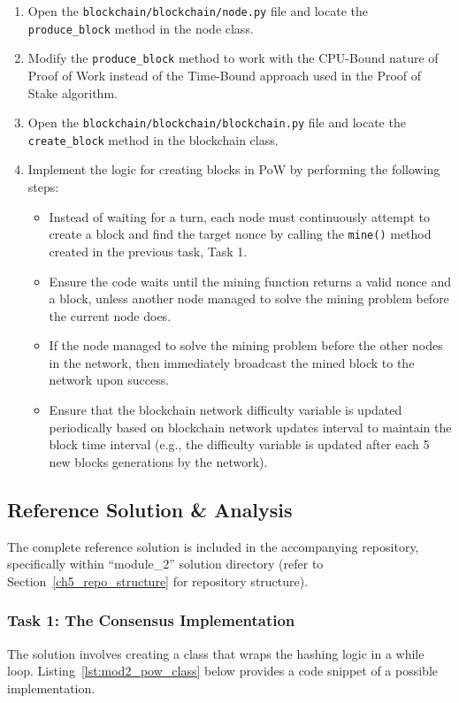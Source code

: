 \begin{enumerate}
    \item Open the \texttt{blockchain/blockchain/node.py} file and locate the \texttt{produce\_block} method in the node class.
    \item Modify the \texttt{produce\_block} method to work with the CPU-Bound nature of Proof of Work instead of the Time-Bound approach used in the Proof of Stake algorithm.
    \item Open the \texttt{blockchain/blockchain/blockchain.py} file and locate the \\\texttt{create\_block} method in the blockchain class. 
    
    \item Implement the logic for creating blocks in PoW by performing the following steps:
    \begin{itemize}
        \item Instead of waiting for a turn, each node must continuously attempt to create a block and find the target nonce by calling the \texttt{mine()} method created in the previous task, Task 1.
        \item Ensure the code waits until the mining function returns a valid nonce and a block, unless another node managed to solve the mining problem before the current node does.
        \item If the node managed to solve the mining problem before the other nodes in the network, then immediately broadcast the mined block to the network upon success.
        \item Ensure that the blockchain network difficulty variable is updated periodically based on blockchain network updates interval to maintain the block time interval (e.g., the difficulty variable is updated after each 5 new blocks generations by the network).
    \end{itemize}
\end{enumerate}

\subsection{Reference Solution \& Analysis}
The complete reference solution is included in the accompanying repository, specifically within \enquote{module\_2} solution directory (refer to Section~\ref{ch5_repo_structure} for repository structure).

\subsubsection*{Task 1: The Consensus Implementation}
The solution involves creating a class that wraps the hashing logic in a while loop. Listing~\ref{lst:mod2_pow_class} below provides a code snippet of a possible implementation.


